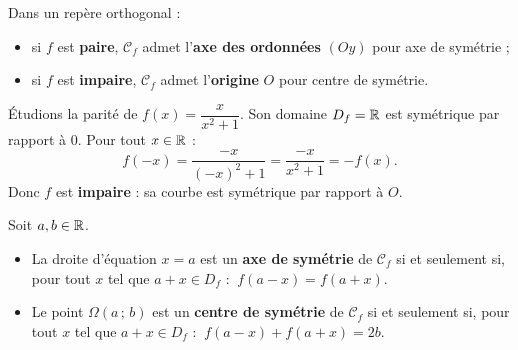 \begin{propriete}
Dans un repère orthogonal :
\begin{itemize}
  \item si $f$ est \textbf{paire}, $\mathcal{C}_f$ admet l'\textbf{axe des ordonnées}
        $(Oy)$ pour axe de symétrie ;
  \item si $f$ est \textbf{impaire}, $\mathcal{C}_f$ admet l'\textbf{origine} $O$
        pour centre de symétrie.
\end{itemize}
\end{propriete}

\begin{illus}
\end{illus}

\begin{exemple}
Étudions la parité de $f(x)=\dfrac{x}{x^2+1}$. Son domaine $D_f=\mathbb{R}$ est symétrique
par rapport à $0$. Pour tout $x\in\mathbb{R}$ :
\[ f(-x)=\frac{-x}{(-x)^2+1}=\frac{-x}{x^2+1}=-f(x). \]
Donc $f$ est \textbf{impaire} : sa courbe est symétrique par rapport à $O$.
\end{exemple}

\begin{theoreme}
Soit $a,b\in\mathbb{R}$.
\begin{itemize}
  \item La droite d'équation $x=a$ est un \textbf{axe de symétrie} de $\mathcal{C}_f$
        si et seulement si, pour tout $x$ tel que $a+x\in D_f$ : $\ f(a-x)=f(a+x)$.
  \item Le point $\Omega(a\,;\,b)$ est un \textbf{centre de symétrie} de
        $\mathcal{C}_f$ si et seulement si, pour tout $x$ tel que $a+x\in D_f$ :
        $\ f(a-x)+f(a+x)=2b$.
\end{itemize}
\end{theoreme}

